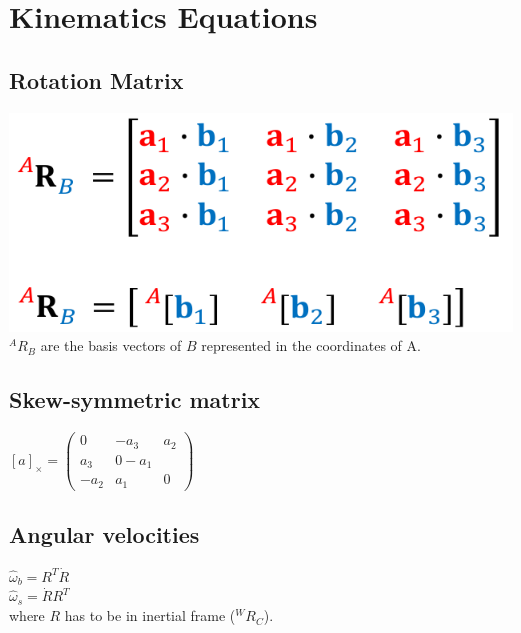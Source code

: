 \section{Kinematics Equations}
\subsection{Rotation Matrix}
\includegraphics[width=\linewidth]{Images/RotMat.png}
$^A R_B$ are the basis vectors of $B$ represented in the coordinates of
A.
\subsection*{Skew-symmetric matrix}
$[a]_\times = \begin{pmatrix}
  0 & -a_3 & a_2 \\ 
  a_3 & 0 -a_1 \\
  -a_2 & a_1 & 0
\end{pmatrix}$

\subsection*{Angular velocities}
$\hat\omega_b = R^T \dot{R}$ \\
$\hat\omega_s = \dot{R}R^T$ \\
where $R$ has to be in inertial frame ($^W R_C$).

